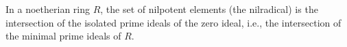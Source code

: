 In a noetherian ring $R$, the set of nilpotent elements (the nilradical) is the intersection of the isolated prime ideals of the zero ideal, i.e., the intersection of the minimal prime ideals of $R$.
